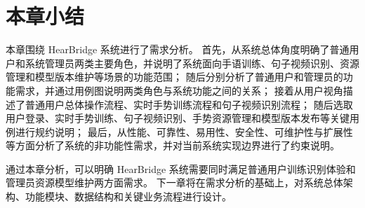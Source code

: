 
\section{本章小结}

本章围绕 HearBridge 系统进行了需求分析。
首先，从系统总体角度明确了普通用户和系统管理员两类主要角色，并说明了系统面向手语训练、句子视频识别、资源管理和模型版本维护等场景的功能范围；
随后分别分析了普通用户和管理员的功能需求，并通过用例图说明两类角色与系统功能之间的关系；
接着从用户视角描述了普通用户总体操作流程、实时手势训练流程和句子视频识别流程；
随后选取用户登录、实时手势训练、句子视频识别、手势资源管理和模型版本发布等关键用例进行规约说明；
最后，从性能、可靠性、易用性、安全性、可维护性与扩展性等方面分析了系统的非功能性需求，并对当前系统实现边界进行了约束说明。

通过本章分析，可以明确 HearBridge 系统需要同时满足普通用户训练识别体验和管理员资源模型维护两方面需求。
下一章将在需求分析的基础上，对系统总体架构、功能模块、数据结构和关键业务流程进行设计。
